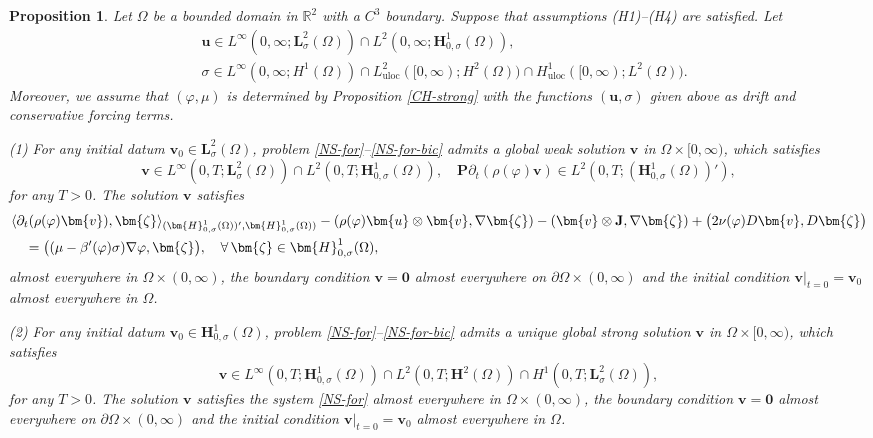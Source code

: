 \documentclass[11pt,reqno]{amsart}
\newtheorem{proposition}{\textbf{Proposition}}[section]
\def\l{\langle}
\def\r{\rangle}
\def\H{\bm{H}}
\def\L{\bm{L}}
\def\J{\mathbf{J}}
\def\uu{\bm{u}}
\def\vv{\bm{v}}
\begin{document}
\begin{proposition}
\label{exe-NS-for}
Let $\Omega$ be a bounded domain in $\mathbb{R}^2$ with a $C^3$ boundary. Suppose that assumptions (H1)--(H4) are satisfied. Let
%
\begin{align*}
&\uu \in L^\infty(0,\infty;\L^2_{\sigma} (\Omega))\cap L^2(0,\infty;\H^1_{0,\sigma}(\Omega)),
\\
&\sigma \in L^\infty(0,\infty;H^1(\Omega)) \cap L^2_{\mathrm{uloc}}([0,\infty); H^2(\Omega))\cap H^1_{\mathrm{uloc}}([0,\infty);L^2(\Omega)).
\end{align*}
%
Moreover, we assume that $(\varphi,\mu)$ is determined by Proposition \ref{CH-strong} with the functions $(\uu,\sigma)$ given above as drift and conservative forcing terms.\smallskip

(1) For any initial datum $\vv_0 \in \L^2_{\sigma}(\Omega)$,  problem  \eqref{NS-for}--\eqref{NS-for-bic} admits a global weak solution $\vv$ in $\Omega\times [0,\infty)$, which satisfies
$$
\vv \in L^\infty(0,T; \L^2_{\sigma}(\Omega))
\cap L^2(0,T; \H^1_{0,\sigma}(\Omega)),\quad \bm{P}\partial_t(\rho(\varphi)\vv)\in L^2(0,T; (\H^1_{0,\sigma}(\Omega))'),
$$
for any $T>0$. The solution $\bm{v}$ satisfies
%
\begin{align}
&\l\partial_t(\rho(\varphi) \vv), \bm{\zeta} \r_{(\H^1_{0,\sigma}(\Omega))',\H^1_{0,\sigma}(\Omega))}
-(  \rho(\varphi) \uu\otimes \vv, \nabla \bm{\zeta} )
-( \vv \otimes \J, \nabla \bm{\zeta} )
+ \big( 2\nu(\varphi) D \vv, D \bm{\zeta} \big)
\notag\\
&\quad
=  \big( (\mu-\beta'(\varphi) \sigma) \nabla \varphi, \bm{\zeta} \big),
\quad \forall\,\bm{\zeta}\in \H^1_{0,\sigma}(\Omega),
\notag
\end{align}
%
almost everywhere in $\Omega \times (0,\infty)$, the boundary condition $\vv=\mathbf{0}$ almost everywhere on $\partial \Omega \times (0,\infty)$ and the initial condition $\vv|_{t=0}=\vv_0$
 almost everywhere in $\Omega$.
 \smallskip

(2) For any initial datum $\vv_0 \in \H^1_{0,\sigma}(\Omega)$,  problem  \eqref{NS-for}--\eqref{NS-for-bic} admits a unique global strong solution $\vv$ in $\Omega\times [0,\infty)$, which satisfies
$$
\vv \in L^\infty(0,T; \H^1_{0,\sigma}(\Omega))
\cap L^2(0,T; \H^2(\Omega))\cap H^1(0,T; \L_\sigma^2(\Omega)),
$$
for any $T>0$.
The solution $\bm{v}$ satisfies the system \eqref{NS-for} almost everywhere in $\Omega \times (0,\infty)$, the boundary condition $\vv=\mathbf{0}$ almost everywhere on $\partial \Omega \times (0,\infty)$ and the initial condition $\vv|_{t=0}=\vv_0$ almost everywhere in $\Omega$.
\end{proposition}
\end{document}
